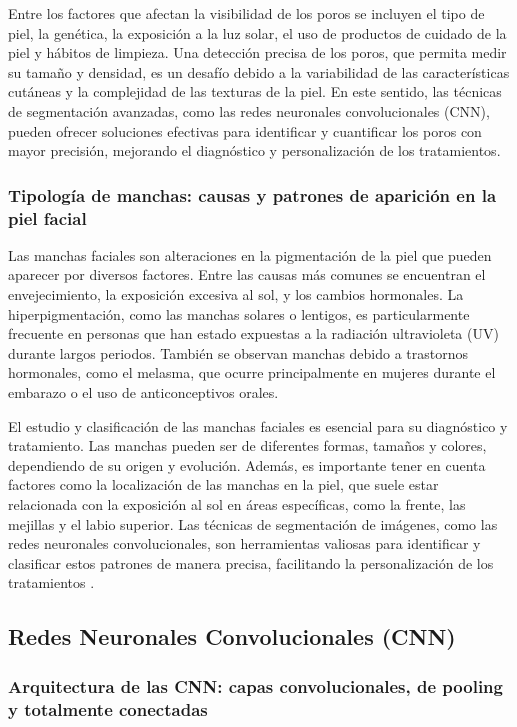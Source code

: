 Entre los factores que afectan la visibilidad de los poros se incluyen el tipo de piel, la genética, la exposición a la luz solar, el uso de productos de cuidado de la piel y hábitos de limpieza. Una detección precisa de los poros, que permita medir su tamaño y densidad, es un desafío debido a la variabilidad de las características cutáneas y la complejidad de las texturas de la piel. En este sentido, las técnicas de segmentación avanzadas, como las redes neuronales convolucionales (CNN), pueden ofrecer soluciones efectivas para identificar y cuantificar los poros con mayor precisión, mejorando el diagnóstico y personalización de los tratamientos.

\cite{cameron2021}

\subsubsection{Tipología de manchas: causas y patrones de aparición en la piel facial}
Las manchas faciales son alteraciones en la pigmentación de la piel que pueden aparecer por diversos factores. Entre las causas más comunes se encuentran el envejecimiento, la exposición excesiva al sol, y los cambios hormonales. La hiperpigmentación, como las manchas solares o lentigos, es particularmente frecuente en personas que han estado expuestas a la radiación ultravioleta (UV) durante largos periodos. También se observan manchas debido a trastornos hormonales, como el melasma, que ocurre principalmente en mujeres durante el embarazo o el uso de anticonceptivos orales.

El estudio y clasificación de las manchas faciales es esencial para su diagnóstico y tratamiento. Las manchas pueden ser de diferentes formas, tamaños y colores, dependiendo de su origen y evolución. Además, es importante tener en cuenta factores como la localización de las manchas en la piel, que suele estar relacionada con la exposición al sol en áreas específicas, como la frente, las mejillas y el labio superior. Las técnicas de segmentación de imágenes, como las redes neuronales convolucionales, son herramientas valiosas para identificar y clasificar estos patrones de manera precisa, facilitando la personalización de los tratamientos \cite{zouboulis2014}.

\subsection{Redes Neuronales Convolucionales (CNN)}

\subsubsection{Arquitectura de las CNN: capas convolucionales, de pooling y totalmente conectadas}

